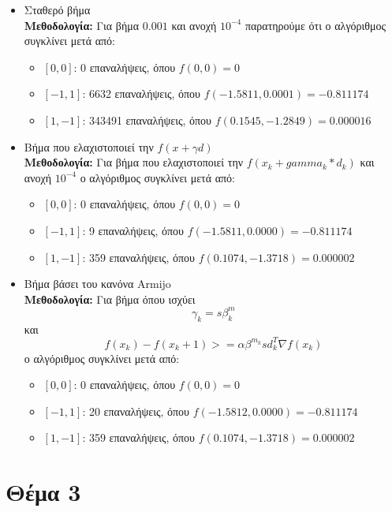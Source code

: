 \documentclass{report}
\begin{document}
\begin{itemize}
    \item Σταθερό βήμα\\
    \textbf{Μεθοδολογία:} Για βήμα $0.001$ και ανοχή $10^{-4}$ παρατηρούμε ότι ο αλγόριθμος συγκλίνει
    μετά από:
    \begin{itemize}
        \item \([0,0]\): 0 επαναλήψεις, όπου $f(0,0) = 0$
        \item \([-1,1]\): 6632 επαναλήψεις, όπου $f(-1.5811, 0.0001) = -0.811174$
        \item \([1,-1]\): 343491 επαναλήψεις, όπου $f(0.1545, -1.2849) =  0.000016$
    \end{itemize}
    
    \item Βήμα που ελαχιστοποιεί την $f(x + γd)$\\
    \textbf{Μεθοδολογία:} Για βήμα που ελαχιστοποιεί την $f(x_k + gamma_k * d_k)$ και ανοχή $10^{-4}$
    ο αλγόριθμος συγκλίνει μετά από:
    \begin{itemize}
        \item \([0,0]\): 0 επαναλήψεις, όπου $f(0,0) = 0$
        \item \([-1,1]\): 9 επαναλήψεις, όπου $f(-1.5811, 0.0000) = -0.811174$
        \item \([1,-1]\): 359 επαναλήψεις, όπου $f(0.1074, -1.3718) = 0.000002$
    \end{itemize}
    \item Βήμα βάσει του κανόνα Armijo\\
    \textbf{Μεθοδολογία:} Για βήμα όπου ισχύει\\
    $$γ_k = s \beta^m_k$$ και 
    $$f(x_k)-f(x_k+1)>=\alpha \beta^{m_k} s d_k^T \nabla f(x_k)$$
    ο αλγόριθμος συγκλίνει μετά από:
    \begin{itemize}
        \item \([0,0]\): 0 επαναλήψεις, όπου $f(0,0) = 0$
        \item \([-1,1]\): 20 επαναλήψεις, όπου $f(-1.5812, 0.0000) = -0.811174$
        \item \([1,-1]\): 359 επαναλήψεις, όπου $f(0.1074, -1.3718) = 0.000002$
    \end{itemize}
\end{itemize}


\chapter{Θέμα 3}
\end{document}
